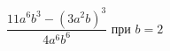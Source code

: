 \begin{ex}
	\begin{condition}
		\( \dfrac{11a^6b^3-(3a^2b)^3}{4a^6b^6} \) при \( b=2 \)
	\end{condition}
\end{ex}